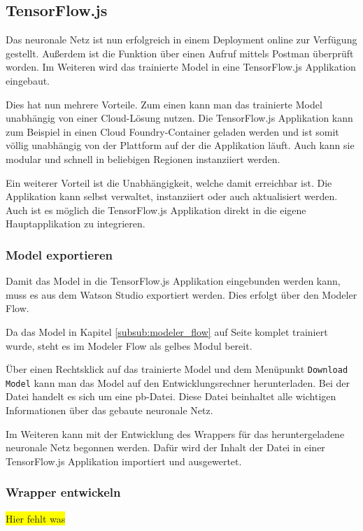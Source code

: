 \subsection{TensorFlow.js}
Das neuronale Netz ist nun erfolgreich in einem Deployment online zur Verfügung gestellt. Außerdem ist die Funktion
über einen Aufruf mittels Postman überprüft worden. Im Weiteren wird das trainierte Model in eine TensorFlow.js
Applikation eingebaut.

Dies hat nun mehrere Vorteile. Zum einen kann man das trainierte Model unabhängig von einer Cloud-Lösung nutzen. Die
TensorFlow.js Applikation kann zum Beispiel in einen Cloud Foundry-Container geladen werden und ist somit völlig unabhängig
von der Plattform auf der die Applikation läuft. Auch kann sie modular und schnell in beliebigen Regionen instanziiert
werden.

Ein weiterer Vorteil ist die Unabhängigkeit, welche damit erreichbar ist. Die Applikation kann selbst verwaltet,
instanziiert oder auch aktualisiert werden. Auch ist es möglich die TensorFlow.js Applikation direkt in die
eigene Hauptapplikation zu integrieren.

\subsubsection{Model exportieren}
Damit das Model in die TensorFlow.js Applikation eingebunden werden kann, muss es aus dem Watson Studio exportiert werden.
Dies erfolgt über den Modeler Flow.

Da das Model in Kapitel \ref{subsub:modeler_flow} auf Seite \pageref{subsub:modeler_flow} komplet trainiert wurde, steht
es im Modeler Flow als gelbes Modul bereit.

Über einen Rechtsklick auf das trainierte Model und dem Menüpunkt \texttt{Download Model} kann man das Model auf den
Entwicklungsrechner herunterladen. Bei der Datei handelt es sich um eine pb-Datei. Diese Datei beinhaltet alle wichtigen
Informationen über das gebaute neuronale Netz.

Im Weiteren kann mit der Entwicklung des Wrappers für das heruntergeladene neuronale Netz begonnen werden. Dafür wird
der Inhalt der Datei in einer TensorFlow.js Applikation importiert und ausgewertet.

\subsubsection{Wrapper entwickeln}
\colorbox{yellow}{Hier fehlt was}

